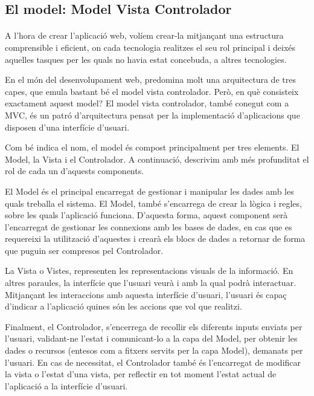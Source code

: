 \subsection{El model: Model Vista Controlador}\label{sec:mvc}

    \paragraph{}
    A l'hora de crear l’aplicació web, volíem crear-la mitjançant una estructura comprensible i eficient, on cada tecnologia realitzes el seu rol principal i deixés aquelles tasques per les quals no havia estat concebuda, a altres tecnologies.

    En el món del desenvolupament web, predomina molt una arquitectura de tres capes, que emula bastant bé el model vista controlador. Però, en què consisteix exactament aquest model? El model vista controlador, també conegut com a MVC, és un patró d'arquitectura pensat per la implementació d'aplicacions que disposen d’una interfície d'usuari.

    Com bé indica el nom, el model és compost principalment per tres elements. El Model, la Vista i el Controlador. A continuació, descrivim amb més profunditat el rol de cada un d’aquests components.

    El Model és el principal encarregat de gestionar i manipular les dades amb les quals treballa el sistema. El Model, també s’encarrega de crear la lògica i regles, sobre les quals l'aplicació funciona. D’aquesta forma, aquest component serà l’encarregat de gestionar les connexions amb les bases de dades, en cas que es requereixi la utilització d’aquestes i crearà els blocs de dades a retornar de forma que puguin ser compresos pel Controlador.

    La Vista o Vistes, representen les representacions visuals de la informació. En altres paraules, la interfície que l’usuari veurà i amb la qual podrà interactuar. Mitjançant les interaccions amb aquesta interfície d'usuari, l'usuari és capaç d’indicar a l’aplicació quines són les accions que vol que realitzi.

    Finalment, el Controlador, s'encerrega de recollir els diferents inputs enviats per l'usuari, validant-ne l'estat i comunicant-lo a la capa del Model, per obtenir les dades o recursos (entesos com a fitxers servits per la capa Model), demanats per l’usuari. En cas de necessitat, el Controlador també és l’encarregat de modificar la vista o l’estat d’una vista, per reflectir en tot moment l’estat actual de l’aplicació a la interfície d’usuari.

